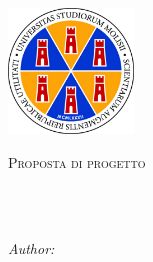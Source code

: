 \documentclass[
11pt, %
oneside, %
italian, %
onehalfspacing,%
headsepline, %
]{MastersDoctoralThesis} %
\author{Federico \textsc{Zappone}} %
\begin{document}
\renewenvironment{abstract}


\pagestyle{plain} %


\begin{titlepage}
\begin{center}

\vspace*{.06\textheight}
{\scshape\LARGE \univname\par}\vspace{0.5cm} %
{\scshape\large \deptname\par}\vspace{1cm} %

\includegraphics[width=0.25\textwidth]{images/logo.png} %
\vspace{1cm}

\textsc{\Large Proposta di progetto}\\[0.5cm] %

\HRule\\[0.4cm] %
{\huge \bfseries \ttitle\par}\vspace{0.4cm} %
\HRule\\[1.5cm] %

\begin{center} \large
\emph{Author:}\\
\href{mailto:f.zappone1@studenti.unimol.it}{\authorname} %
\end{center}


\end{center}
\end{titlepage}
\end{document}
